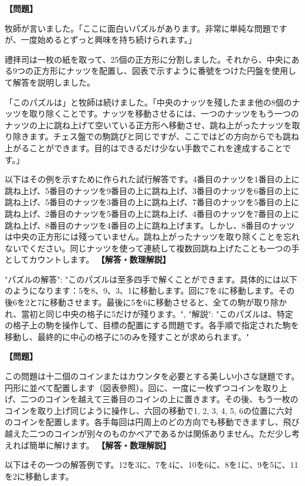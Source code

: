 \documentclass[10pt,a4paper,oneside,openany]{ltjsbook}
\begin{document}
\begin{tcolorbox}[colback=softblue,colframe=primaryblue,title=\textbf{第 229 問：THE NINE ALMONDS.},arc=2mm,boxrule=1pt,breakable]
\textbf{【問題】}\par\vspace{0.3em}

牧師が言いました。「ここに面白いパズルがあります。非常に単純な問題ですが、一度始めるとずっと興味を持ち続けられます。」

禮拝司は一枚の紙を取って、25個の正方形に分割しました。それから、中央にある9つの正方形にナッツを配置し、図表で示すように番號をつけた円盤を使用して解答を説明しました。

「このパズルは」と牧師は続けました。「中央のナッツを殘したまま他の8個のナッツを取り除くことです。ナッツを移動させるには、一つのナッツをもう一つのナッツの上に跳ね上げて空いている正方形へ移動させ、跳ね上がったナッツを取り除きます。チェス盤での駒跳びと同じですが、ここではどの方向からでも跳ね上がることができます。目的はできるだけ少ない手数でこれを達成することです。」

以下はその例を示すために作られた試行解答です。4番目のナッツを1番目の上に跳ね上げ、5番目のナッツを9番目の上に跳ね上げ、3番目のナッツを6番目の上に跳ね上げ、5番目のナッツを3番目の上に跳ね上げ、7番目のナッツを5番目の上に跳ね上げ、2番目のナッツを5番目の上に跳ね上げ、4番目のナッツを7番目の上に跳ね上げ、8番目のナッツを4番目の上に跳ね上げます。しかし、8番目のナッツは中央の正方形には殘っていません。跳ね上がったナッツを取り除くことを忘れないでください。同じナッツを使って連続して複数回跳ね上げたことも一つの手としてカウントします。
\tcblower
\textbf{【解答・数理解説】}\par\vspace{0.3em}
{
"パズルの解答": "このパズルは至多四手で解くことができます。具体的には以下のようになります：5を8、9、3、1に移動します。回に7を4に移動します。その後6を2と7に移動させます。最後に5を6に移動させると、全ての駒が取り除かれ、當初と同じ中央の格子に5だけが殘ります。",
"解説": "このパズルは、特定の格子上の駒を操作して、目標の配置にする問題です。各手順で指定された駒を移動し、最終的に中心の格子に5のみを殘すことが求められます。"
}
\end{tcolorbox}

\begin{tcolorbox}[colback=softblue,colframe=primaryblue,title=\textbf{第 230 問：十二ペンスの謎題 （原題: THE TWELVE PENNIES.）},arc=2mm,boxrule=1pt,breakable]
\textbf{【問題】}\par\vspace{0.3em}
この問題は十二個のコインまたはカウンタを必要とする美しい小さな謎題です。円形に並べて配置します（図表參照）。回に、一度に一枚ずつコインを取り上げ、二つのコインを越えて三番目のコインの上に置きます。その後、もう一枚のコインを取り上げ同じように操作し、六回の移動で1, 2, 3, 4, 5, 6の位置に六対のコインを配置します。各手每回は円周上のどの方向でも移動できますし、飛び越えた二つのコインが別々のものかペアであるかは関係ありません。ただ少し考えれば簡単に解けます。
\tcblower
\textbf{【解答・数理解説】}\par\vspace{0.3em}
以下はその一つの解答例です。12を3に、7を4に、10を6に、8を1に、9を5に、11を2に移動します。
\end{tcolorbox}
\end{document}
